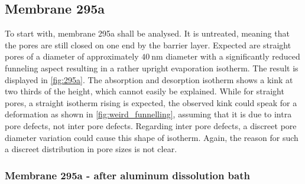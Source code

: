 \documentclass[thesis.tex]{subfiles}
\begin{document}
        

        \subsection{Membrane 295a}

            

            To start with, membrane 295a shall be analysed. It is untreated, meaning that the pores are still closed on one end by the barrier layer. Expected are straight pores of a diameter of approximately
            $\SI{40}{\nano\meter}$ diameter with a significantly reduced funneling aspect resulting in a rather upright evaporation isotherm. The result is displayed in \cref{fig:295a}. The absorption and desorption isotherm shows a kink at two thirds of the height, which cannot easily be explained. While for straight pores, a straight isotherm rising is expected, the observed kink could speak for a deformation as shown in \cref{fig:weird_funnelling}, assuming that it is due to intra pore defects, not inter pore defects. Regarding inter pore defects, a discreet pore diameter variation could cause this shape of isotherm. Again, the reason for such a discreet distribution in pore sizes is not clear.

            


            \subsubsection{Membrane 295a - after aluminum dissolution bath}
\end{document}
